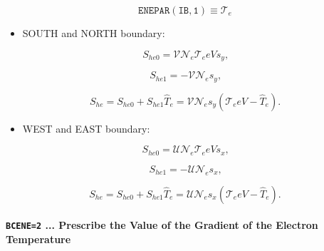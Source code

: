 \documentclass[11pt]{article}
\begin{document}
\bigskip

\begin{equation*}
\mathtt{ENEPAR(IB,1)}\equiv\mathcal{T}_{e}
\end{equation*}

\bigskip

\begin{itemize}
\item  SOUTH and NORTH boundary:
\end{itemize}

\bigskip

\begin{equation}
S_{he0}=\mathcal{VN}_{e}\mathcal{T}_{e}eVs_{y}\text{,}   \label{c163}
\end{equation}

\begin{equation}
S_{he1}=-\mathcal{VN}_{e}s_{y}\text{,}   \label{c164}
\end{equation}

\begin{equation}
S_{he}=S_{he0}+S_{he1}\widehat{T}_{e}=\mathcal{VN}_{e}s_{y}\left( \mathcal{T}%
_{e}eV-\widehat{T}_{e}\right) \text{.}   \label{c165}
\end{equation}

\bigskip

\begin{itemize}
\item  WEST and EAST boundary:
\end{itemize}

\bigskip

\begin{equation}
S_{he0}=\mathcal{UN}_{e}\mathcal{T}_{e}eVs_{x}\text{,}   \label{c166}
\end{equation}

\begin{equation}
S_{he1}=-\mathcal{UN}_{e}s_{x}\text{,}   \label{c167}
\end{equation}

\begin{equation}
S_{he}=S_{he0}+S_{he1}\widehat{T}_{e}=\mathcal{UN}_{e}s_{x}\left( \mathcal{T}%
_{e}eV-\widehat{T}_{e}\right) \text{.}   \label{c168}
\end{equation}

\bigskip

\paragraph{\texttt{BCENE=2} ... Prescribe the Value of the Gradient of the
Electron Temperature}
\end{document}
